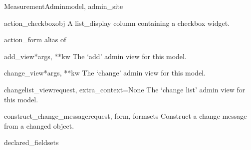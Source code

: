 \documentclass[letterpaper,10pt,english]{sphinxmanual}
\begin{document}
\hypertarget{data.admin.MeasurementAdmin}{}\begin{classdesc}{MeasurementAdmin}{model, admin\_site}~

\hypertarget{data.admin.MeasurementAdmin.action_checkbox}{}\begin{methoddesc}{action\_checkbox}{obj}
A list\_display column containing a checkbox widget.
\end{methoddesc}

\hypertarget{data.admin.MeasurementAdmin.action_form}{}\begin{memberdesc}{action\_form}
alias of 
\end{memberdesc}

\hypertarget{data.admin.MeasurementAdmin.add_view}{}\begin{methoddesc}{add\_view}{*args, **kw}
The `add' admin view for this model.
\end{methoddesc}

\hypertarget{data.admin.MeasurementAdmin.change_view}{}\begin{methoddesc}{change\_view}{*args, **kw}
The `change' admin view for this model.
\end{methoddesc}

\hypertarget{data.admin.MeasurementAdmin.changelist_view}{}\begin{methoddesc}{changelist\_view}{request, extra\_context=None}
The `change list' admin view for this model.
\end{methoddesc}

\hypertarget{data.admin.MeasurementAdmin.construct_change_message}{}\begin{methoddesc}{construct\_change\_message}{request, form, formsets}
Construct a change message from a changed object.
\end{methoddesc}

\hypertarget{data.admin.MeasurementAdmin.declared_fieldsets}{}\begin{memberdesc}{declared\_fieldsets}\end{memberdesc}


\end{classdesc}
\end{document}
